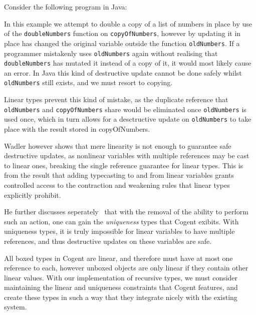 Consider the following program in Java:



In this example we attempt to double a copy of a list of numbers in place by use of the \verb|doubleNumbers|
function on \verb|copyOfNumbers|, however by updating it in place has changed the original variable outside
the function \verb|oldNumbers|. If a programmer mistakenly uses \verb|oldNumbers| again without realising that
\verb|doubleNumbers| has mutated it instead of a copy of it, it would most likely cause an error. In 
Java this kind of destructive update cannot be done safely whilst \verb|oldNumbers| still exists, and we
must resort to copying.

Linear types prevent this kind of mistake, as the duplicate reference that
\verb|oldNumbers| and \verb|copyOfNumbers| share would be eliminated once \verb|oldNumbers| is used once,
which in turn allows for a desctructive update on \verb|oldNumbers| to take place with the result stored in
copyOfNumbers.

Wadler however shows that mere linearity is not enough to guarantee safe destructive updates, as nonlinear
variables with multiple references may be cast to linear ones, breaking the single reference guarantee
for linear types. This is from the result that adding typecasting to and from linear variables grants 
controlled access to the contraction and weakening rules that linear types explicitly prohibit.

He further discusses seperately~\cite{WadlerLinearLogic} that with the removal of
the ability to perform such an action, one can gain the \textit{uniqueness} types that Cogent 
exibits. With uniqueness types, it is truly impossible for linear variables to have multiple references,
and thus destructive updates on these variables are safe. 

All boxed types in Cogent are linear, and therefore must have at most one reference to each,
however unboxed objects are only linear if they contain other linear values.
With our implementation of recursive types, we must consider maintaining the linear and uniqueness constraints
that Cogent features, and create these types in such a way that they integrate nicely with the existing
system.